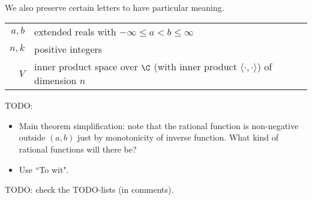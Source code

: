 \\
We also preserve certain letters to have particular meaning.
\\
\begin{tabular}{r l}
	$a, b$ & extended reals with $-\infty \leq a < b \leq \infty$ \\ 
	$n, k$ & positive integers \\
	$V$ & inner product space over $\C$ (with inner product $\langle \cdot, \cdot \rangle$) of dimension $n$ \\
\end{tabular}

TODO:

\begin{itemize}
	\item Main theorem simplification: note that the rational function is non-negative outside $(a, b)$ just by monotonicity of inverse function. What kind of rational functions will there be?
	\item Use ``To wit".
\end{itemize}

TODO: check the TODO-lists (in comments).


















